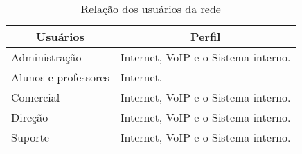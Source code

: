 \begin{table}[h!]
	\centering
	\renewcommand{\arraystretch}{2.0}
	\caption{Relação dos usuários da rede}
	\label{tab2}
	\begin{tabular}{|l|l|}
		\hline
		\multicolumn{1}{|c|}{\textbf{Usuários}} &	 \multicolumn{1}{|c|}{\textbf{Perfil}}                                 		  \\ \hline		
		Administração                                 
		& Internet, VoIP e o Sistema interno. 
		\\ \hline
		Alunos e professores                                   
		&Internet. 
	    \\ \hline
		Comercial                                
		&Internet, VoIP e o Sistema interno. 
		\\ \hline
		Direção                                 
		&Internet, VoIP e o Sistema interno. 
		\\ \hline
		Suporte                                  
		&Internet, VoIP e o Sistema interno. 	
		\\ \hline
	\end{tabular}
\end{table}